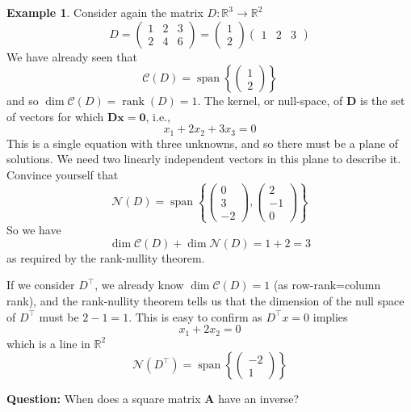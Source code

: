 \documentclass[]{book}
\theoremstyle{definition}
\theoremstyle{definition}
\newtheorem{example}{Example}[chapter]
\theoremstyle{definition}
\theoremstyle{remark}
\begin{document}
\begin{example}
\protect\hypertarget{exm:ranknullityeg}{}{\label{exm:ranknullityeg} }Consider again the matrix \(D: \mathbb{R}^3\rightarrow \mathbb{R}^2\)
\[ D=\left( \begin{array}{ccc} 1 & 2&3\\ 2&4&6 \end{array}\right)= \left( \begin{array}{c} 1 \\ 2 \end{array}\right)\left(\begin{array}{ccc}1&2&3\end{array}\right)
\]
We have already seen that
\[\mathcal{C}(D)=\operatorname{span}\left\{\left(\begin{array}{c}1\\2\end{array}\right)\right\}\]
and so \(\dim \mathcal{C}(D)=\operatorname{rank}(D)=1\).
The kernel, or null-space, of \(\boldsymbol D\) is the set of vectors for which \(\boldsymbol D\boldsymbol x=\boldsymbol 0\), i.e.,
\[x_1+2x_2+3x_3=0\]
This is a single equation with three unknowns, and so there must be a plane of solutions. We need two linearly independent vectors in this plane to describe it. Convince yourself that
\[\mathcal{N}(D) = \operatorname{span}\left\{\left(\begin{array}{c}0\\3\\-2\end{array}\right), \left(\begin{array}{c}2\\-1\\0\end{array}\right)\right\}\]
So we have
\[\dim \mathcal{C}(D)+\dim \mathcal{N}(D)=1+2=3\]
as required by the rank-nullity theorem.

If we consider \(D^\top\), we already know \(\dim \mathcal{C}(D)=1\) (as row-rank=column rank), and the rank-nullity theorem tells us that the dimension of the null space of \(D^\top\) must be \(2-1=1\). This is easy to confirm as \(D^\top x=0\) implies
\[x_1+2x_2=0\]
which is a line in \(\mathbb{R}^2\)
\[\mathcal{N}(D^\top) = \operatorname{span}\left\{ \left(\begin{array}{c}-2\\1\end{array}\right)\right\}\]
\end{example}

\textbf{Question:} When does a square matrix \(\boldsymbol A\) have an inverse?
\end{document}
